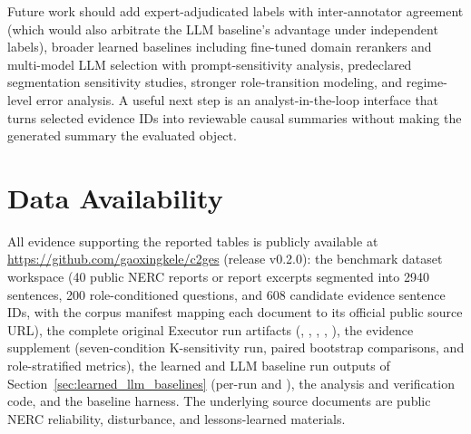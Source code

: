 \documentclass{ieeeaccess}
\begin{document}
Future work should add expert-adjudicated labels with inter-annotator agreement (which would also arbitrate the LLM baseline's advantage under independent labels), broader learned baselines including fine-tuned domain rerankers and multi-model LLM selection with prompt-sensitivity analysis, predeclared segmentation sensitivity studies, stronger role-transition modeling, and regime-level error analysis. A useful next step is an analyst-in-the-loop interface that turns selected evidence IDs into reviewable causal summaries without making the generated summary the evaluated object.

\section*{Data Availability}

All evidence supporting the reported tables is publicly available at \url{https://github.com/gaoxingkele/c2ges} (release v0.2.0): the benchmark dataset workspace (40 public NERC reports or report excerpts segmented into 2940 sentences, 200 role-conditioned questions, and 608 candidate evidence sentence IDs, with the corpus manifest mapping each document to its official public source URL), the complete original Executor run artifacts (, , , , ), the evidence supplement (seven-condition K-sensitivity run, paired bootstrap comparisons, and role-stratified metrics), the learned and LLM baseline run outputs of Section~\ref{sec:learned_llm_baselines} (per-run  and ), the analysis and verification code, and the baseline harness. The underlying source documents are public NERC reliability, disturbance, and lessons-learned materials.
\end{document}
